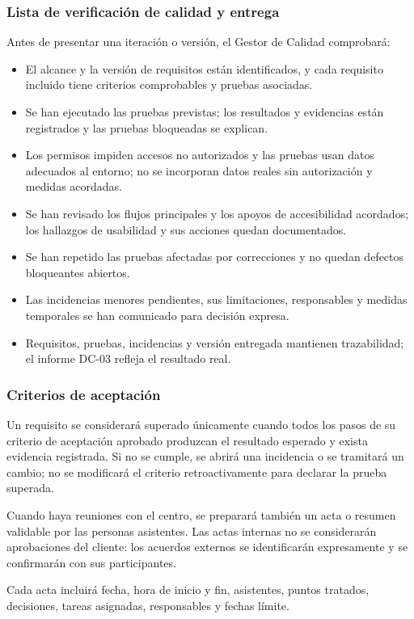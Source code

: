 \subsubsection{Lista de verificación de calidad y entrega}
Antes de presentar una iteración o versión, el Gestor de Calidad comprobará:
\begin{itemize}[leftmargin=*]
  \item El alcance y la versión de requisitos están identificados, y cada requisito incluido tiene criterios comprobables y pruebas asociadas.
  \item Se han ejecutado las pruebas previstas; los resultados y evidencias están registrados y las pruebas bloqueadas se explican.
  \item Los permisos impiden accesos no autorizados y las pruebas usan datos adecuados al entorno; no se incorporan datos reales sin autorización y medidas acordadas.
  \item Se han revisado los flujos principales y los apoyos de accesibilidad acordados; los hallazgos de usabilidad y sus acciones quedan documentados.
  \item Se han repetido las pruebas afectadas por correcciones y no quedan defectos bloqueantes abiertos.
  \item Las incidencias menores pendientes, sus limitaciones, responsables y medidas temporales se han comunicado para decisión expresa.
  \item Requisitos, pruebas, incidencias y versión entregada mantienen trazabilidad; el informe DC-03 refleja el resultado real.
\end{itemize}

\subsubsection{Criterios de aceptación}
Un requisito se considerará superado únicamente cuando todos los pasos de su criterio de aceptación aprobado produzcan el resultado esperado y exista evidencia registrada. Si no se cumple, se abrirá una incidencia o se tramitará un cambio; no se modificará el criterio retroactivamente para declarar la prueba superada.

Cuando haya reuniones con el centro, se preparará también un acta o resumen validable por las personas asistentes. Las actas internas no se considerarán aprobaciones del cliente: los acuerdos externos se identificarán expresamente y se confirmarán con sus participantes.

Cada acta incluirá fecha, hora de inicio y fin, asistentes, puntos tratados, decisiones, tareas asignadas, responsables y fechas límite.

